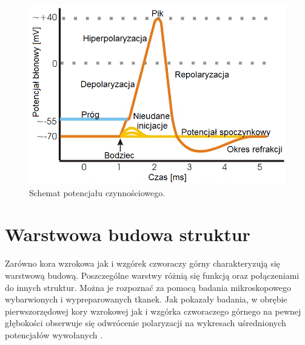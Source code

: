 \documentclass{pracamgr_2}
\begin{document}
	\begin{figure}[htbp]
		\begin{center}
			\includegraphics[scale=0.5]{pot_spoczy.png}
		\end{center}
		\caption{Schemat potencjału czynnościowego.}
		\label{rys:pot_spoczy}
	\end{figure}
	\newpage
	\section{Warstwowa budowa struktur}
	Zarówno kora wzrokowa jak i wzgórek czworaczy górny charakteryzują się warstwową budową. Poszczególne warstwy różnią się funkcją oraz połączeniami do innych struktur. 
	Można je rozpoznać za pomocą badania mikroskopowego wybarwionych i wypreparowanych tkanek. Jak pokazały badania, w obrębie pierwszorzędowej kory wzrokowej jak i wzgórka czworaczego górnego na pewnej głębokości obserwuje się odwrócenie polaryzacji na wykresach uśrednionych potencjałów wywołanych \citep{maier2, SC_warstwy}.
\end{document}
